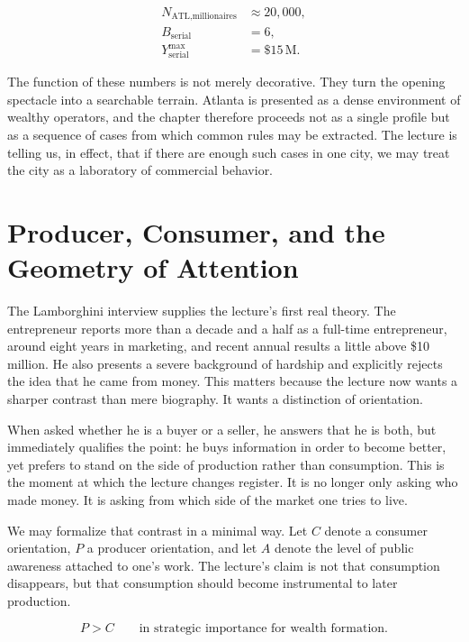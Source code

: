 \begin{align}
N_{\text{ATL,millionaires}} &\approx 20{,}000,\\
B_{\text{serial}} &= 6,\\
Y^{\max}_{\text{serial}} &= \$15\,\mathrm{M}.
\end{align}

The function of these numbers is not merely decorative. They turn the opening spectacle into a searchable terrain. Atlanta is presented as a dense environment of wealthy operators, and the chapter therefore proceeds not as a single profile but as a sequence of cases from which common rules may be extracted. The lecture is telling us, in effect, that if there are enough such cases in one city, we may treat the city as a laboratory of commercial behavior.

\section{Producer, Consumer, and the Geometry of Attention}

The Lamborghini interview supplies the lecture's first real theory. The entrepreneur reports more than a decade and a half as a full-time entrepreneur, around eight years in marketing, and recent annual results a little above \$10 million. He also presents a severe background of hardship and explicitly rejects the idea that he came from money. This matters because the lecture now wants a sharper contrast than mere biography. It wants a distinction of orientation.

When asked whether he is a buyer or a seller, he answers that he is both, but immediately qualifies the point: he buys information in order to become better, yet prefers to stand on the side of production rather than consumption. This is the moment at which the lecture changes register. It is no longer only asking who made money. It is asking from which side of the market one tries to live.

We may formalize that contrast in a minimal way. Let \(C\) denote a consumer orientation, \(P\) a producer orientation, and let \(A\) denote the level of public awareness attached to one's work. The lecture's claim is not that consumption disappears, but that consumption should become instrumental to later production.

\begin{equation}
P > C \qquad \text{in strategic importance for wealth formation.}
\end{equation}

